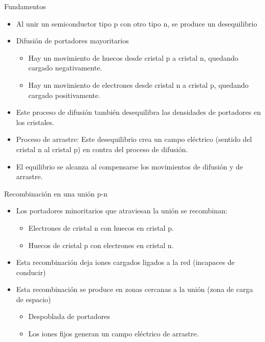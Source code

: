 \documentclass[xcolor={usenames,svgnames,dvipsnames}]{beamer}
\begin{document}
\begin{frame}[label=sec-1-4-2]{Fundamentos}
\begin{itemize}
\item Al \alert{unir un semiconductor tipo p con otro tipo n, se produce un
desequilibrio}

\item \alert{Difusión de portadores mayoritarios}

\begin{itemize}
\item Hay un movimiento de huecos desde cristal p a cristal n, quedando
cargado negativamente.

\item Hay un movimiento de electrones desde cristal n a cristal p,
quedando cargado positivamente.
\end{itemize}

\item Este proceso de difusión también \alert{desequilibra} las densidades de
portadores en los cristales.

\item \alert{Proceso de arrastre}: Este desequilibrio \alert{crea un campo eléctrico}
(sentido del cristal n al cristal p) en contra del proceso de
difusión.

\item El \alert{equilibrio} se alcanza al \alert{compensarse los movimientos de
difusión y de arrastre}.
\end{itemize}
\end{frame}

\begin{frame}[label=sec-1-4-3]{Recombinación en una unión p-n}
\begin{itemize}
\item Los \alert{portadores minoritarios que atraviesan la unión se recombinan}:

\begin{itemize}
\item Electrones de cristal n con huecos en cristal p.

\item Huecos de cristal p con electrones en cristal n.
\end{itemize}

\item Esta recombinación deja \alert{iones cargados ligados a la red} (incapaces
de conducir)

\item Esta recombinación se produce en \alert{zonas cercanas a la unión} (zona de
carga de espacio)

\begin{itemize}
\item Despoblada de portadores

\item \alert{Los iones fijos generan un campo eléctrico de arrastre}.
\end{itemize}
\end{itemize}
\end{frame}
\end{document}
